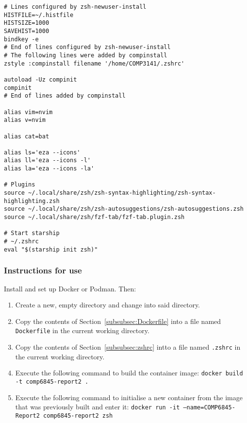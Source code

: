 \begin{verbatim}
# Lines configured by zsh-newuser-install
HISTFILE=~/.histfile
HISTSIZE=1000
SAVEHIST=1000
bindkey -e
# End of lines configured by zsh-newuser-install
# The following lines were added by compinstall
zstyle :compinstall filename '/home/COMP3141/.zshrc'

autoload -Uz compinit
compinit
# End of lines added by compinstall

alias vim=nvim
alias v=nvim

alias cat=bat

alias ls='eza --icons'
alias ll='eza --icons -l'
alias la='eza --icons -la'

# Plugins
source ~/.local/share/zsh/zsh-syntax-highlighting/zsh-syntax-highlighting.zsh
source ~/.local/share/zsh/zsh-autosuggestions/zsh-autosuggestions.zsh
source ~/.local/share/zsh/fzf-tab/fzf-tab.plugin.zsh

# Start starship
# ~/.zshrc
eval "$(starship init zsh)"
\end{verbatim}

\subsubsection{Instructions for use}

Install and set up Docker or Podman. Then:

\begin{enumerate}
    \item Create a new, empty directory and change into said directory.
    \item Copy the contents of Section~\ref{subsubsec:Dockerfile} into a file named \texttt{Dockerfile} in the current working directory.
    \item Copy the contents of Section~\ref{subsubsec:zshrc} intto a file named \texttt{.zshrc} in the current working directory.
    \item Execute the following command to build the container image: \texttt{docker build -t comp6845-report2 .}
    \item Execute the following command to initialise a new container from the image that was previously built and enter it: \texttt{docker run -it --name=COMP6845-Report2 comp6845-report2 zsh}
\end{enumerate}


